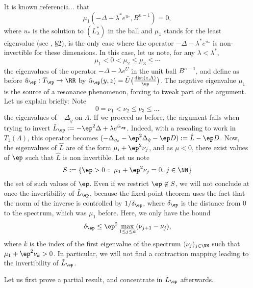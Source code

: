 It is known {\color{red} referencia...} that 
$$
\mu_1(-\Delta-\lambda^\ast e^{u_\ast},B^{n-1})=0,
$$
where $u_\ast$ is the solution to $(L_\lambda^\ast)$ in the ball and $\mu_1$
stands for the least eigenvalue (see \cite{stable-solutions-elliptic}, \S 2),
is the only case where the operator $-\Delta-\lambda^\ast e^{u_\ast}$ is
non-invertible for these dimensions. In this case, let us note, for any
$\lambda < \lambda^\ast$,
$$\mu_1<0<\mu_2\leq \mu_3\leq \cdots$$
the eigenvalues of the operator $-\Delta-\lambda e^{\tilde U}$ in the unit ball
$B^{n-1}$, and define as before $\tilde u_\ep:T_\ep\to\RR$ by $\tilde
u_\ep(y,z)=\tilde U\big(\frac{\operatorname{dist}(z,\Lambda)}{\ep}\big)$. The
negative eigenvalue $\mu_1$ is the source of a resonance phenomenon, forcing
to tweak part of the argument. Let us explain briefly: Note
$$0=\nu_1<\nu_2\leq\nu_3\leq\dots $$
the eigenvalues of $-\Delta_{\mathring g}$ on $\Lambda$. If we proceed as
before, the argument fails when trying to invert $\tilde
L_\ep:=-\ep^2\Delta+\lambda e^{\tilde u_\ep}$. Indeed, with a rescaling to work
in $T_1( \Lambda )$, this operator becomes $(-\Delta_{g_z}-\ep^2
\Delta_{\mathring g}-\ep D):=\hat L - \ep D$. Now, the eigenvalues of $\hat L$
are of the form $\mu_i+\ep^2\nu_j$, and as $\mu<0$, there exist values of $\ep$
such that $\hat L$ is non invertible. Let us note
$$
S:=\{\ep>0\,:\; \mu_1+\ep^2\nu_j=0,\, j\in \NN\}
$$
the set of such values of $\ep$. Even if we restrict $\ep\not\in S$, we will not
conclude at once the invertibility of $\tilde L_\ep$, because the fixed-point
theorem uses the fact that the norm of the inverse is controlled by
$1/\delta_\ep$, where $\delta_\ep$ is the distance from $0$ to the spectrum,
which was $\mu_1$ before. Here, we only have the bound
$$
\delta_\ep\leq\ep^2 \max_{1\leq j \leq k}(\nu_{j+1}-\nu_j),
$$
where $k$ is the index of the first eigenvalue of the spectrum
$(\nu_j)_{j\in\NN}$ such that $\mu_1+\ep^2\nu_k>0$. In particular, we will not
find a contraction mapping leading to the invertibility of $\tilde L_\ep$.

Let us first prove a partial result, and concentrate in $\tilde L_\ep$ afterwards.

